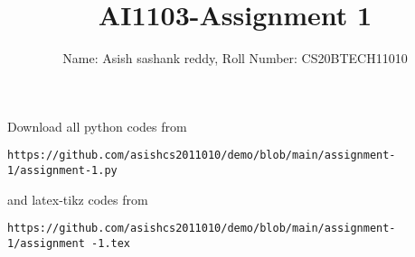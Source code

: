 \documentclass[journal,12pt,twocolumn]{IEEEtran}
\DeclareMathOperator*{\Res}{Res}
\begin{document}
\newcommand{\BEQA}{\begin{eqnarray}}
\newcommand{\EEQA}{\end{eqnarray}}
\newcommand{\define}{\stackrel{\triangle}{=}}

\raggedbottom
\setlength{\parindent}{0pt}
\providecommand{\mbf}{\mathbf}
\providecommand{\pr}[1]{\ensuremath{\Pr\left(#1\right)}}
\providecommand{\qfunc}[1]{\ensuremath{Q\left(#1\right)}}
\providecommand{\sbrak}[1]{\ensuremath{{}\left[#1\right]}}
\providecommand{\lsbrak}[1]{\ensuremath{{}\left[#1\right.}}
\providecommand{\rsbrak}[1]{\ensuremath{{}\left.#1\right]}}
\providecommand{\brak}[1]{\ensuremath{\left(#1\right)}}
\providecommand{\lbrak}[1]{\ensuremath{\left(#1\right.}}
\providecommand{\rbrak}[1]{\ensuremath{\left.#1\right)}}
\providecommand{\cbrak}[1]{\ensuremath{\left\{#1\right\}}}
\providecommand{\lcbrak}[1]{\ensuremath{\left\{#1\right.}}
\providecommand{\rcbrak}[1]{\ensuremath{\left.#1\right\}}}
\theoremstyle{remark}
\newtheorem{rem}{Remark}
\newcommand{\sgn}{\mathop{\mathrm{sgn}}}
\providecommand{\abs}[1]{\vert#1\vert}
\providecommand{\res}[1]{\Res\displaylimits_{#1}} 
\providecommand{\norm}[1]{\lVert#1\rVert}
\providecommand{\mtx}[1]{\mathbf{#1}}
\providecommand{\mean}[1]{E[ #1 ]}
\providecommand{\fourier}{\overset{\mathcal{F}}{ \rightleftharpoons}}
\providecommand{\system}{\overset{\mathcal{H}}{ \longleftrightarrow}}
\newcommand{\solution}{\noindent \textbf{Solution: }}
\newcommand{\cosec}{\,\text{cosec}\,}
\providecommand{\dec}[2]{\ensuremath{\overset{#1}{\underset{#2}{\gtrless}}}}
\newcommand{\myvec}[1]{\ensuremath{\begin{pmatrix}#1\end{pmatrix}}}
\newcommand{\mydet}[1]{\ensuremath{\begin{vmatrix}#1\end{vmatrix}}}
\makeatletter
{}
\makeatother
\let\StandardTheFigure\thefigure
\let\vec\mathbf
\renewcommand{\thefigure}{\theproblem}
\def\putbox#1#2#3{\makebox[0in][l]{\makebox[#1][l]{}\raisebox{\baselineskip}[0in][0in]{\raisebox{#2}[0in][0in]{#3}}}}
     \def\rightbox#1{\makebox[0in][r]{#1}}
     \def\centbox#1{\makebox[0in]{#1}}
     \def\topbox#1{\raisebox{-\baselineskip}[0in][0in]{#1}}
     \def\midbox#1{\raisebox{-0.5\baselineskip}[0in][0in]{#1}}
\vspace{3cm}
\title{AI1103-Assignment 1}
\author{Name: Asish sashank reddy, Roll Number: CS20BTECH11010}
\maketitle
\newpage
\bigskip
\renewcommand{\thefigure}{\theenumi}
\renewcommand{\thetable}{\theenumi}
Download all python codes from 
\begin{lstlisting}
https://github.com/asishcs2011010/demo/blob/main/assignment-1/assignment-1.py
\end{lstlisting}
%
and latex-tikz codes from 
%
\begin{lstlisting}
https://github.com/asishcs2011010/demo/blob/main/assignment-1/assignment -1.tex
\end{lstlisting}
\end{document}
